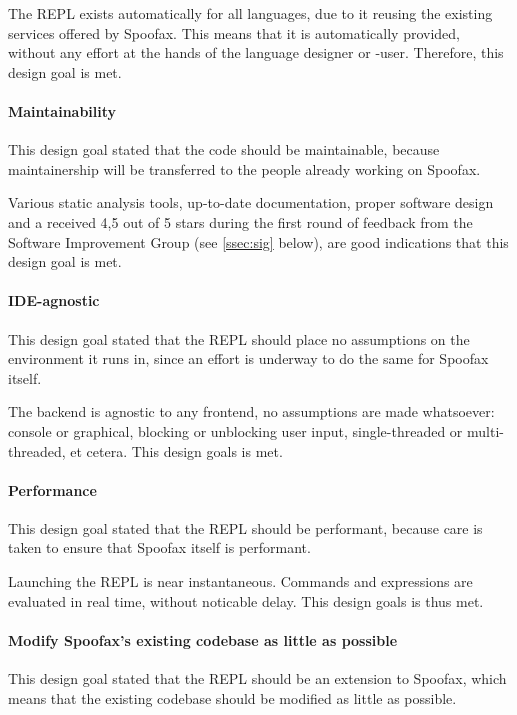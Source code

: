 The REPL exists automatically for all languages, due to it reusing the existing
services offered by Spoofax. This means that it is automatically provided,
without any effort at the hands of the language designer or -user. Therefore,
this design goal is met.

\paragraph{Maintainability} This design goal stated that the code should be
maintainable, because maintainership will be transferred to the people already
working on Spoofax.

Various static analysis tools, up-to-date documentation, proper software design
and a received 4,5 out of 5 stars during the first round of feedback from the
Software Improvement Group (see \cref{ssec:sig} below), are good indications that
this design goal is met.

\paragraph{IDE-agnostic} This design goal stated that the REPL should place no
assumptions on the environment it runs in, since an effort is underway to do the
same for Spoofax itself.

The backend is agnostic to any frontend, no assumptions are made whatsoever:
console or graphical, blocking or unblocking user input, single-threaded or
multi-threaded, et cetera. This design goals is met.

\paragraph{Performance} This design goal stated that the REPL should be
performant, because care is taken to ensure that Spoofax itself is performant.

Launching the REPL is near instantaneous. Commands and expressions are evaluated
in real time, without noticable delay. This design goals is thus met.

\paragraph{Modify Spoofax's existing codebase as little as possible} This design
goal stated that the REPL should be an extension to Spoofax, which means that
the existing codebase should be modified as little as possible.

